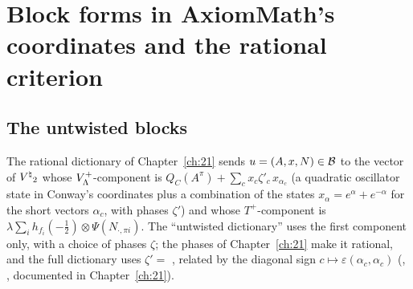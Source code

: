 \section{Block forms in AxiomMath's coordinates and the rational criterion}\label{ch22:sec:blocks}

\subsection{The untwisted blocks}

The rational dictionary of Chapter~\ref{ch:21} sends $u=(A,x,N)\in\mathcal{B}$ to the vector of ${V^{\natural}}_2$ whose
$V_{\Lambda}^+$-component is $Q_C(A^\pi)+\sum_c x_c\zeta'_c\,x_{\alpha_c}$ (a quadratic oscillator state in Conway's
coordinates plus a combination of the states $x_\alpha=e^\alpha+e^{-\alpha}$ for the short vectors $\alpha_c$, with phases
$\zeta'$) and whose $T^+$-component is $\lambda\sum_i h_{f_i}(-\tfrac12)\otimes\Psi(N_{\cdot,\pi i})$.  The ``untwisted
dictionary''  uses the first component only, with a choice of phases $\zeta$; the phases
 of Chapter~\ref{ch:21} make it rational, and the full dictionary uses
$\zeta'=$ , related by the diagonal sign $c\mapsto\varepsilon(\alpha_c,\alpha_c)$ (,
, documented in Chapter~\ref{ch:21}).

